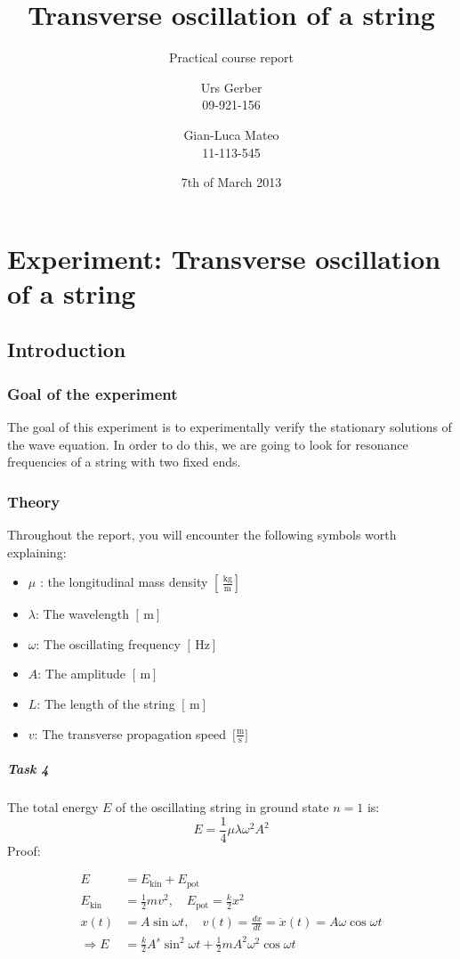 \documentclass{scrreprt}
\author{Urs Gerber\\09-921-156 \and Gian-Luca Mateo\\11-113-545}
\date{7th of March 2013}
\title{Transverse oscillation of a string}
\subtitle{Practical course report}
\newcommand{\unit}[1]{\ensuremath{\, \mathrm{#1}}}
\begin{document}
\maketitle

\tableofcontents
\newpage

\chapter{Experiment: Transverse oscillation of a string}
\section{Introduction}

\subsection{Goal of the experiment}
The goal of this experiment is to experimentally verify the stationary solutions of the wave equation. In order to do this, we are going to look for resonance frequencies of a string with two fixed ends.
\subsection{Theory}
Throughout the report, you will encounter the following symbols worth explaining:
\begin{itemize}
\item $\mu$ : the longitudinal mass density $[\unit{\frac{kg}{m}}]$
\item $\lambda$: The wavelength $[\unit{m}]$
\item $\omega$: The oscillating frequency $[\unit{Hz}]$
\item $A$: The amplitude $[\unit{m}]$
\item $L$: The length of the string $[\unit{m}]$
\item $v$: The transverse propagation speed $\unit{[\frac{m}{s}}]$
\end{itemize}

\paragraph*{Task 4}
The total energy $E$ of the oscillating string in ground state $n=1$ is:
\begin{equation}
E=\frac{1}{4} \mu \lambda \omega^2 A^2
\end{equation}
Proof:

\begin{align}
E &= E_{\text{kin}} + E_{\text{pot}}\\
E_{\text{kin}} &= \frac{1}{2} m v^2 , \quad E_{\text{pot}} = \frac{k}{2} x^2\\
x(t) &= A \sin{\omega t} , \quad v(t) = \frac{dx}{dt} = \dot{x}(t) = A \omega \cos{\omega t}\\
\Rightarrow E &= \frac{k}{2} A^s \sin^2{\omega t} + \frac{1}{2} m A^2 \omega^2 \cos{\omega t}
\end{align}
\end{document}
